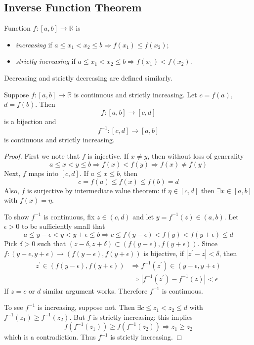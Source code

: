 \documentclass[10pt, a4paper, twoside]{report}
\begin{document}
\subsection{Inverse Function Theorem}
\begin{definition}
    Function \(f:[a,b]\to\mathbb{R}\) is 
    \begin{itemize}
        \item \emph{increasing} if \(a\leq x_1<x_2\leq b\Rightarrow f(x_1)\leq f(x_2)\);
        \item \emph{strictly increasing} if \(a\leq x_1<x_2\leq b\Rightarrow f(x_1)< f(x_2)\).
    \end{itemize}
    Decreasing and strictly decreasing are defined similarly.
    \label{def:f_increasing}
\end{definition}
\begin{theorem}
    Suppose \(f:[a,b]\to\mathbb{R}\) is continuous and strictly increasing. Let \(c=f(a)\), \(d=f(b)\). Then 
    \[f:[a,b]\to[c,d]\]
    is a bijection and
    \[f^{-1}:[c,d]\to[a,b]\]
    is continuous and strictly increasing.
    \label{thm:ift_1}
\end{theorem}
\begin{proof}
    First we note that \(f\) is injective. If \(x\neq y\), then without loss of generality
    \[a\leq x<y\leq b\Rightarrow f(x)<f(y)\Rightarrow f(x)\neq f(y)\]
    Next, \(f\) maps into \([c,d]\). If \(a\leq x\leq b\), then 
    \[c=f(a)\leq f(x)\leq f(b)=d\]
    Also, \(f\) is surjective by intermediate value theorem: if \(\eta\in[c,d]\) then \(\exists x\in[a,b]\) with \(f(x)=\eta\).

    To show \(f^{-1}\) is continuous, fix \(z\in(c,d)\) and let \(y=f^{-1}(z)\in(a,b)\). Let \(\epsilon>0\) to be sufficiently small that
    \[a\leq y-\epsilon<y<y+\epsilon\leq b\Rightarrow c\leq f(y-\epsilon)<f(y)<f(y+\epsilon)\leq d\]
    Pick \(\delta>0\) such that \((z-\delta,z+\delta)\subset(f(y-\epsilon),f(y+\epsilon))\). Since \(f:(y-\epsilon,y+\epsilon)\to(f(y-\epsilon),f(y+\epsilon))\) is bijective, if \(|z^\prime-z|<\delta\), then 
    \begin{align*}
        z^\prime\in(f(y-\epsilon),f(y+\epsilon))&\Rightarrow f^{-1}(z^\prime)\in(y-\epsilon,y+\epsilon) \\
        &\Rightarrow|f^{-1}(z^\prime)-f^{-1}(z)|<\epsilon
    \end{align*}
    If \(z=c\) or \(d\) similar argument works. Therefore \(f^{-1}\) is continuous.

    To see \(f^{-1}\) is increasing, suppose not. Then \(\exists c\leq z_1<z_2\leq d\) with \(f^{-1}(z_1)\geq f^{-1}(z_2)\). But \(f\) is strictly increasing; this implies 
    \[f\left(f^{-1}(z_1)\right)\geq f\left(f^{-1}(z_2)\right)\Rightarrow z_1\geq z_2\]
    which is a contradiction. Thus \(f^{-1}\) is strictly increasing.
\end{proof}
\end{document}
